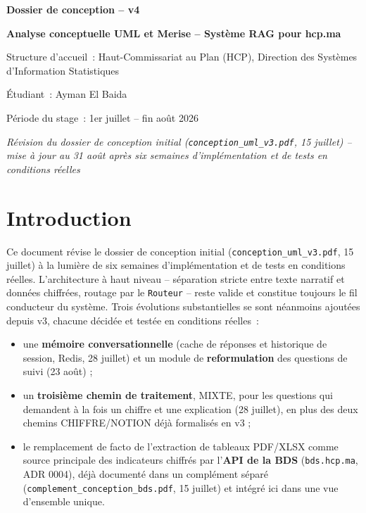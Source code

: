 \documentclass[11pt,a4paper]{article}
\begin{document}
\begin{titlepage}
\centering
\vspace*{2cm}
{\Huge\bfseries\color{navy} Dossier de conception -- v4\par}
\vspace{0.5cm}
{\Large\bfseries\color{gold} Analyse conceptuelle UML et Merise -- Syst\`eme RAG pour hcp.ma\par}
\vspace{1.5cm}
{\large\color{greytext} Structure d'accueil~: Haut-Commissariat au Plan (HCP), Direction des Syst\`emes d'Information Statistiques\par}
\vspace{0.3cm}
{\large\color{greytext} \'Etudiant~: Ayman El Baida\par}
\vspace{0.3cm}
{\large\color{greytext} P\'eriode du stage~: 1er juillet -- fin ao\^ut 2026\par}
\vspace{0.3cm}
{\large\itshape\color{greytext} R\'evision du dossier de conception initial (\texttt{conception\_uml\_v3.pdf}, 15 juillet) --\\mise \`a jour au 31 ao\^ut apr\`es six semaines d'impl\'ementation et de tests en conditions r\'eelles\par}
\vfill
\end{titlepage}

\tableofcontents
\newpage

\section{Introduction}
Ce document r\'evise le dossier de conception initial (\texttt{conception\_uml\_v3.pdf}, 15 juillet) \`a la lumi\`ere de six semaines d'impl\'ementation et de tests en conditions r\'eelles. L'architecture \`a haut niveau -- s\'eparation stricte entre texte narratif et donn\'ees chiffr\'ees, routage par le \texttt{Routeur} -- reste valide et constitue toujours le fil conducteur du syst\`eme. Trois \'evolutions substantielles se sont n\'eanmoins ajout\'ees depuis v3, chacune d\'ecid\'ee et test\'ee en conditions r\'eelles~:

\begin{itemize}
\item une \textbf{m\'emoire conversationnelle} (cache de r\'eponses et historique de session, Redis, 28 juillet) et un module de \textbf{reformulation} des questions de suivi (23 ao\^ut) ;
\item un \textbf{troisi\`eme chemin de traitement}, MIXTE, pour les questions qui demandent \`a la fois un chiffre et une explication (28 juillet), en plus des deux chemins CHIFFRE/NOTION d\'ej\`a formalis\'es en v3 ;
\item le remplacement de facto de l'extraction de tableaux PDF/XLSX comme source principale des indicateurs chiffr\'es par l'\textbf{API de la BDS} (\texttt{bds.hcp.ma}, ADR 0004), d\'ej\`a document\'e dans un compl\'ement s\'epar\'e (\texttt{complement\_conception\_bds.pdf}, 15 juillet) et int\'egr\'e ici dans une vue d'ensemble unique.
\end{itemize}
\end{document}
